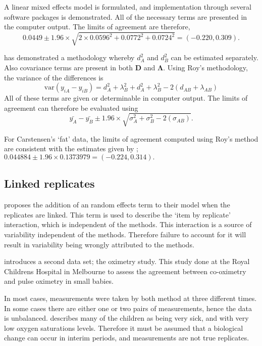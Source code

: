 \documentclass[12pt, a4paper]{report}
\theoremstyle{plain}
\theoremstyle{definition}
\theoremstyle{remark}
\begin{document}
A linear mixed effects model is formulated, and implementation through several software packages is demonstrated.
All of the necessary terms are presented in the computer output. The limits of agreement are therefore,
\begin{equation}
0.0449  \pm 1.96 \times  \sqrt{2 \times 0.0596^2 + 0.0772^2 + 0.0724^2} = (-0.220,  0.309).
\end{equation}

\citet{roy} has demonstrated a methodology whereby $d^2_{A}$ and $d^2_{B}$ can be estimated separately. Also covariance terms are present in both $\boldsymbol{D}$ and $\boldsymbol{\Lambda}$. Using Roy's methodology, the variance of the differences is
\begin{equation}
\mbox{var} (y_{iA}-y_{iB})= d^2_{A} + \lambda^2_{B} + d^2_{A} + \lambda^2_{B} - 2(d_{AB} + \lambda_{AB})
\end{equation}
All of these terms are given or determinable in computer output.
The limits of agreement can therefore be evaluated using
\begin{equation}
\bar{y_{A}}-\bar{y_{B}} \pm 1.96 \times \sqrt{ \sigma^2_{A} + \sigma^2_{B}  - 2(\sigma_{AB})}.
\end{equation}

For Carstensen's `fat' data, the limits of agreement computed using Roy's
method are consistent with the estimates given by \citet{BXC2008}; $0.044884  \pm 1.96 \times  0.1373979 = (-0.224,  0.314).$

\subsection{Linked replicates}

\citet{BXC2008} proposes the addition of an random effects term to their model when the replicates are linked. This term is used to describe the `item by replicate' interaction, which is independent of the methods. This interaction is a source of variability independent of the methods. Therefore failure to account for it will result in variability being wrongly attributed to the methods.

\citet{BXC2008} introduces a second data set; the oximetry study. This study done at the Royal Childrens Hospital in
Melbourne to assess the agreement between co-oximetry and pulse oximetry in small babies.

In most cases, measurements were taken by both method at three different times. In some cases there are either one or two pairs of measurements, hence the data is unbalanced. \citet{BXC2008} describes many of the children as being very sick, and with very low oxygen saturations levels. Therefore it must be assumed that a biological change can occur in interim periods, and measurements are not true replicates.
\end{document}
